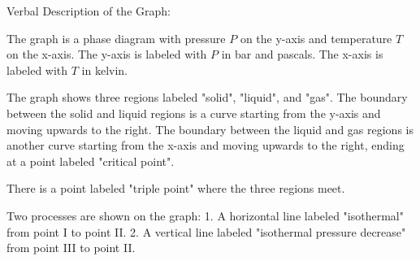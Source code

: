 Verbal Description of the Graph:

The graph is a phase diagram with pressure \( P \) on the y-axis and temperature \( T \) on the x-axis. The y-axis is labeled with \( P \) in bar and pascals. The x-axis is labeled with \( T \) in kelvin.

The graph shows three regions labeled "solid", "liquid", and "gas". The boundary between the solid and liquid regions is a curve starting from the y-axis and moving upwards to the right. The boundary between the liquid and gas regions is another curve starting from the x-axis and moving upwards to the right, ending at a point labeled "critical point".

There is a point labeled "triple point" where the three regions meet.

Two processes are shown on the graph:
1. A horizontal line labeled "isothermal" from point I to point II.
2. A vertical line labeled "isothermal pressure decrease" from point III to point II.